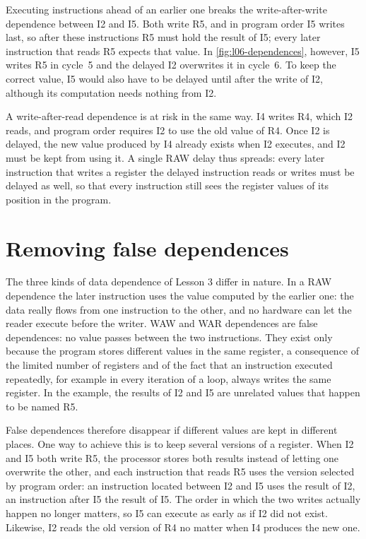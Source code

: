 \documentclass[../main.tex]{subfiles}
\begin{document}
Executing instructions ahead of an earlier one breaks the write-after-write
dependence between I2 and I5.  Both write R5, and in program order I5 writes
last, so after these instructions R5 must hold the result of I5; every later
instruction that reads R5 expects that value.  In \cref{fig:l06-dependences},
however, I5 writes R5 in cycle~5 and the delayed I2 overwrites it in
cycle~6.  To keep the correct value, I5 would also have to be delayed until
after the write of I2, although its computation needs nothing from I2.

A write-after-read dependence is at risk in the same way.  I4 writes R4,
which I2 reads, and program order requires I2 to use the old value of R4.
Once I2 is delayed, the new value produced by I4 already exists when I2
executes, and I2 must be kept from using it.  A single RAW delay thus
spreads: every later instruction that writes a register the delayed
instruction reads or writes must be delayed as well, so that every
instruction still sees the register values of its position in the program.

\section{Removing false dependences}
\label{sec:l06-false}

The three kinds of data dependence of Lesson 3 differ in
nature.  In a RAW dependence the
later instruction uses the value computed by the earlier one: the data
really flows from one instruction to the other, and no hardware can let the
reader execute before the writer.  WAW and
WAR dependences%
 are false
dependences: no value
passes between the two instructions.  They exist only because the program
stores different values in the same register, a consequence of the limited
number of registers and of the fact that an instruction executed
repeatedly, for example in every iteration of a loop, always writes the
same register.  In the example, the
results of I2 and I5 are unrelated values that happen to be named R5.

False dependences therefore disappear if different values are kept in
different places.  One way to achieve this is to keep several versions of a
register.  When I2 and I5 both write R5, the processor stores both results
instead of letting one overwrite the other, and each instruction that reads
R5 uses the version selected by program order: an instruction located
between I2 and I5 uses the result of I2, an instruction after I5 the result
of I5.  The order in which the two writes actually happen no longer matters,
so I5 can execute as early as if I2 did not exist.  Likewise, I2 reads the
old version of R4 no matter when I4 produces the new one.
\end{document}

